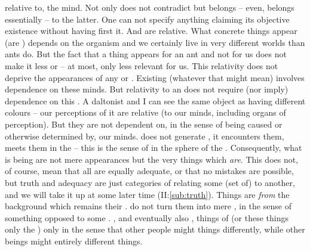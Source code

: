 relative to, the mind.  Not only  does not contradict
 but belongs -- even, belongs essentially -- to the
latter. One can not specify anything claiming its objective existence without
having first  it. And  are relative.  What
concrete things appear (are ) depends on the organism and we
certainly live in very different worlds than ants do. But the fact that a thing
appears for an ant and not for us does not make it less  or
 -- at most, only less relevant for us.  This relativity does not
deprive the appearances of any  or .
%
Existing  (whatever that might mean) involves dependence on
these minds. But relativity to an  does not require (nor imply)
dependence on this . A daltonist and I can see the same object as
having different colours -- our perceptions of it are relative (to our minds,
including organs of perception). But they are not dependent on, in the sense of
being caused or otherwise determined by, our minds.
 does not generate , it encounters them, meets
them in the  -- this is the sense of  
in the sphere of the .
%
Consequently, what is being  are not mere appearances but the
very things 
which {\em are}.  This does not, of course, mean that all  are
equally adequate, or that no mistakes are possible, but truth and adequacy are
just categories of relating some (set of)  to another, and we
will take it up at some later time (II:\ref{sub:truth}).  Things are
 {\em from} 
the background which remains their .
 do not turn them into mere , in the sense of
something opposed to some .
, and eventually also ,  things of
 (or these things  only  the
 ) only in the sense that other people might
 things differently, while other beings might 
entirely different things.

